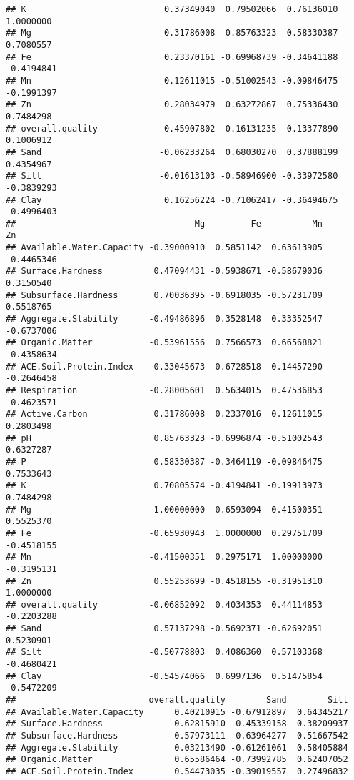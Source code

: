 \documentclass[]{article}
\begin{document}
\begin{verbatim}
## K                           0.37349040  0.79502066  0.76136010  1.0000000
## Mg                          0.31786008  0.85763323  0.58330387  0.7080557
## Fe                          0.23370161 -0.69968739 -0.34641188 -0.4194841
## Mn                          0.12611015 -0.51002543 -0.09846475 -0.1991397
## Zn                          0.28034979  0.63272867  0.75336430  0.7484298
## overall.quality             0.45907802 -0.16131235 -0.13377890  0.1006912
## Sand                       -0.06233264  0.68030270  0.37888199  0.4354967
## Silt                       -0.01613103 -0.58946900 -0.33972580 -0.3839293
## Clay                        0.16256224 -0.71062417 -0.36494675 -0.4996403
##                                   Mg         Fe          Mn         Zn
## Available.Water.Capacity -0.39000910  0.5851142  0.63613905 -0.4465346
## Surface.Hardness          0.47094431 -0.5938671 -0.58679036  0.3150540
## Subsurface.Hardness       0.70036395 -0.6918035 -0.57231709  0.5518765
## Aggregate.Stability      -0.49486896  0.3528148  0.33352547 -0.6737006
## Organic.Matter           -0.53961556  0.7566573  0.66568821 -0.4358634
## ACE.Soil.Protein.Index   -0.33045673  0.6728518  0.14457290 -0.2646458
## Respiration              -0.28005601  0.5634015  0.47536853 -0.4623571
## Active.Carbon             0.31786008  0.2337016  0.12611015  0.2803498
## pH                        0.85763323 -0.6996874 -0.51002543  0.6327287
## P                         0.58330387 -0.3464119 -0.09846475  0.7533643
## K                         0.70805574 -0.4194841 -0.19913973  0.7484298
## Mg                        1.00000000 -0.6593094 -0.41500351  0.5525370
## Fe                       -0.65930943  1.0000000  0.29751709 -0.4518155
## Mn                       -0.41500351  0.2975171  1.00000000 -0.3195131
## Zn                        0.55253699 -0.4518155 -0.31951310  1.0000000
## overall.quality          -0.06852092  0.4034353  0.44114853 -0.2203288
## Sand                      0.57137298 -0.5692371 -0.62692051  0.5230901
## Silt                     -0.50778803  0.4086360  0.57103368 -0.4680421
## Clay                     -0.54574066  0.6997136  0.51475854 -0.5472209
##                          overall.quality        Sand        Silt
## Available.Water.Capacity      0.40210915 -0.67912897  0.64345217
## Surface.Hardness             -0.62815910  0.45339158 -0.38209937
## Subsurface.Hardness          -0.57973111  0.63964277 -0.51667542
## Aggregate.Stability           0.03213490 -0.61261061  0.58405884
## Organic.Matter                0.65586464 -0.73992785  0.62407052
## ACE.Soil.Protein.Index        0.54473035 -0.39019557  0.27496832

\end{verbatim}
\end{document}
